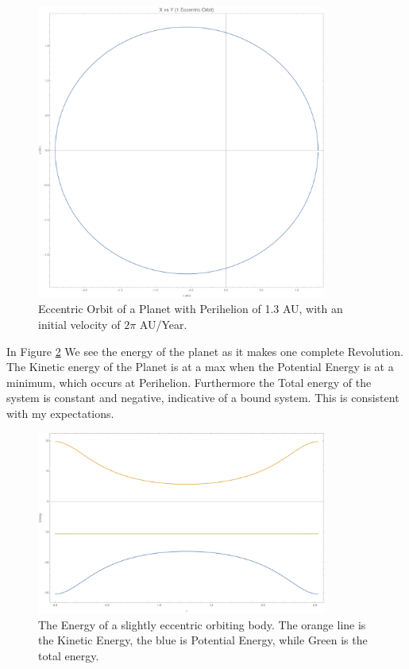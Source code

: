 \documentclass{article}
\begin{document}
\begin{figure}[!htb]
	\begin{center}
		\includegraphics[width=0.85\textwidth]{eccen.pdf}
	\end{center}
	\caption{Eccentric Orbit of a Planet with Perihelion of 1.3 AU, with an initial velocity of $2\pi$ AU/Year.}
	\label{fig:eccen}
\end{figure}
\FloatBarrier


In Figure \ref{fig:energy} We see the energy of the planet as it makes one complete Revolution. The Kinetic energy of the Planet is at a max when the Potential Energy is at a minimum, which occurs at Perihelion. Furthermore the Total energy of the system is constant and negative, indicative of a bound system. This is consistent with my expectations.

\begin{figure}[!htb]
	\begin{center}
		\includegraphics[width=0.85\textwidth]{energy.pdf}
	\end{center}
	\caption{The Energy of a slightly eccentric orbiting body. The orange line is the Kinetic Energy, the blue is Potential Energy, while Green is the total energy.}
\label{fig:energy}
\end{figure}
\FloatBarrier
\end{document}
